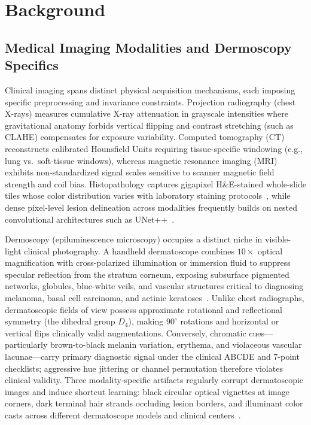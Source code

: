 \section{Background}
\label{sec:background}

\subsection{Medical Imaging Modalities and Dermoscopy Specifics}
Clinical imaging spans distinct physical acquisition mechanisms, each imposing specific preprocessing and invariance constraints. Projection radiography (chest X-rays) measures cumulative X-ray attenuation in grayscale intensities where gravitational anatomy forbids vertical flipping and contrast stretching (such as CLAHE) compensates for exposure variability. Computed tomography (CT) reconstructs calibrated Hounsfield Units requiring tissue-specific windowing (e.g., lung vs.\ soft-tissue windows), whereas magnetic resonance imaging (MRI) exhibits non-standardized signal scales sensitive to scanner magnetic field strength and coil bias. Histopathology captures gigapixel H\&E-stained whole-slide tiles whose color distribution varies with laboratory staining protocols~\cite{Yang2023medmnist}, while dense pixel-level lesion delineation across modalities frequently builds on nested convolutional architectures such as UNet++~\cite{Zhou2020unet}.

Dermoscopy (epiluminescence microscopy) occupies a distinct niche in visible-light clinical photography. A handheld dermatoscope combines $10\times$ optical magnification with cross-polarized illumination or immersion fluid to suppress specular reflection from the stratum corneum, exposing subsurface pigmented networks, globules, blue-white veils, and vascular structures critical to diagnosing melanoma, basal cell carcinoma, and actinic keratoses~\cite{Tschandl2018dataset}. Unlike chest radiographs, dermatoscopic fields of view possess approximate rotational and reflectional symmetry (the dihedral group $D_4$), making $90^\circ$ rotations and horizontal or vertical flips clinically valid augmentations. Conversely, chromatic cues—particularly brown-to-black melanin variation, erythema, and violaceous vascular lacunae—carry primary diagnostic signal under the clinical ABCDE and 7-point checklists; aggressive hue jittering or channel permutation therefore violates clinical validity. Three modality-specific artifacts regularly corrupt dermatoscopic images and induce shortcut learning: black circular optical vignettes at image corners, dark terminal hair strands occluding lesion borders, and illuminant color casts across different dermatoscope models and clinical centers~\cite{Lee1997dullrazor,Finlayson2004shades}.

